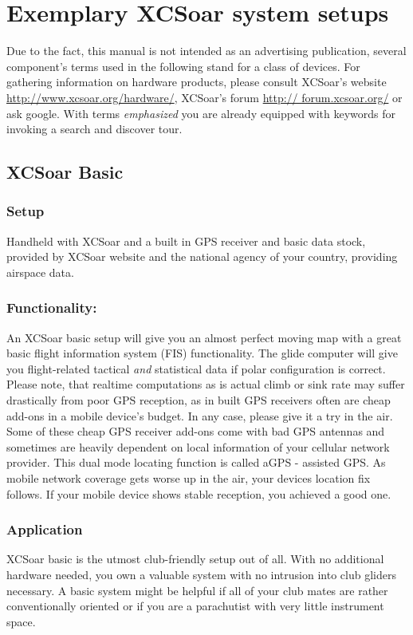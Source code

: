 \section{Exemplary XCSoar system setups}
Due to the fact, this manual is not intended as an advertising publication, 
several component's terms used in the following stand for a class of devices. For 
gathering information on hardware products, please consult XCSoar's website 
\url{http://www.xcsoar.org/hardware/}, XCSoar's forum \url{http://
forum.xcsoar.org/} or ask google. With terms \emph{emphasized} you are already 
equipped with keywords for invoking a search and discover tour.

\subsection*{XCSoar Basic}
\subsubsection*{Setup} Handheld with XCSoar and a built in GPS receiver and basic 
data stock, provided by XCSoar website and the national agency of your country, 
providing airspace data.

\subsubsection*{Functionality:} An XCSoar basic setup will give you an almost 
perfect moving map with a great basic flight information system (FIS) 
functionality. The glide computer will give you flight-related tactical 
\emph{and} statistical data if polar configuration is correct. Please note, that 
realtime computations as is actual climb or sink rate may suffer drastically from 
poor GPS reception, as in built GPS receivers often are cheap add-ons in a mobile 
device's budget. In any case, please give it a try in the air.  Some of these 
cheap GPS receiver add-ons come with bad GPS antennas and sometimes are heavily 
dependent on local information of your cellular network provider. This dual mode 
locating function is called aGPS - assisted GPS. As mobile network coverage gets 
worse up in the air, your devices location fix follows. If your mobile device 
shows stable reception, you achieved a good one.

\subsubsection*{Application} XCSoar basic is the utmost club-friendly setup out 
of all.  With no additional hardware needed, you own a valuable system with no 
intrusion into club gliders necessary. A basic system might be helpful if all of 
your club mates are rather conventionally oriented or if you are a parachutist 
with very little instrument space.

